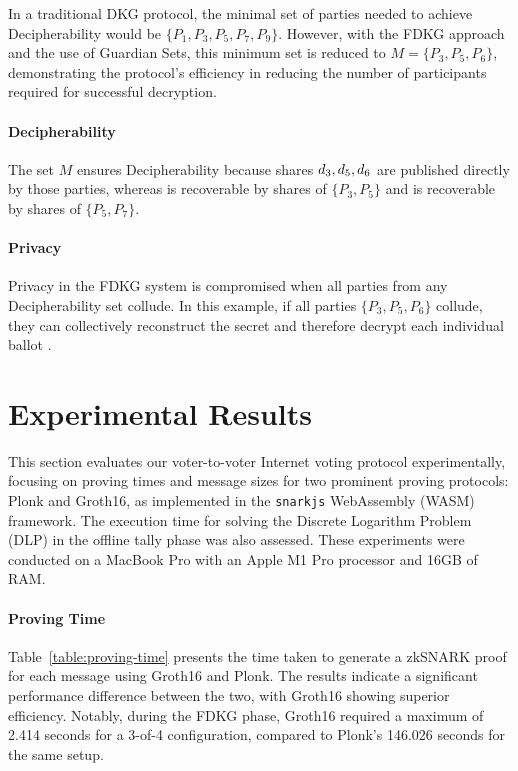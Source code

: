 \documentclass[runningheads]{llncs}
\begin{document}
In a traditional DKG protocol, the minimal set of parties needed to achieve Decipherability would be \(\{P_1, P_3, P_5, P_7, P_9 \}\). However, with the FDKG approach and the use of Guardian Sets, this minimum set is reduced to \(M = \{P_3, P_5, P_6\}\), demonstrating the protocol's efficiency in reducing the number of participants required for successful decryption.

\paragraph{Decipherability}
The set $M$ ensures Decipherability because shares $d_{3},d_{5},d_{6}$ are published directly by those parties, whereas  is recoverable by shares of \(\{P_3, P_5\}\) and  is recoverable by shares of \(\{P_5, P_7\}\).

\paragraph{Privacy}
Privacy in the FDKG system is compromised when all parties from any Decipherability set collude. In this example, if all parties \(\{P_3, P_5, P_6\}\) collude, they can collectively reconstruct the secret \DecryptionKey{} and therefore decrypt each individual ballot .



\section{Experimental Results}

This section evaluates our voter-to-voter Internet voting protocol experimentally, focusing on proving times and message sizes for two prominent proving protocols: Plonk and Groth16, as implemented in the \texttt{snarkjs} WebAssembly (WASM) framework. The execution time for solving the Discrete Logarithm Problem (DLP) in the offline tally phase was also assessed. These experiments were conducted on a MacBook Pro with an Apple M1 Pro processor and 16GB of RAM.

\paragraph{Proving Time}

Table~\ref{table:proving-time} presents the time taken to generate a zkSNARK proof for each message using Groth16 and Plonk. The results indicate a significant performance difference between the two, with Groth16 showing superior efficiency. Notably, during the FDKG phase, Groth16 required a maximum of 2.414 seconds for a 3-of-4 configuration, compared to Plonk's 146.026 seconds for the same setup.
\end{document}
